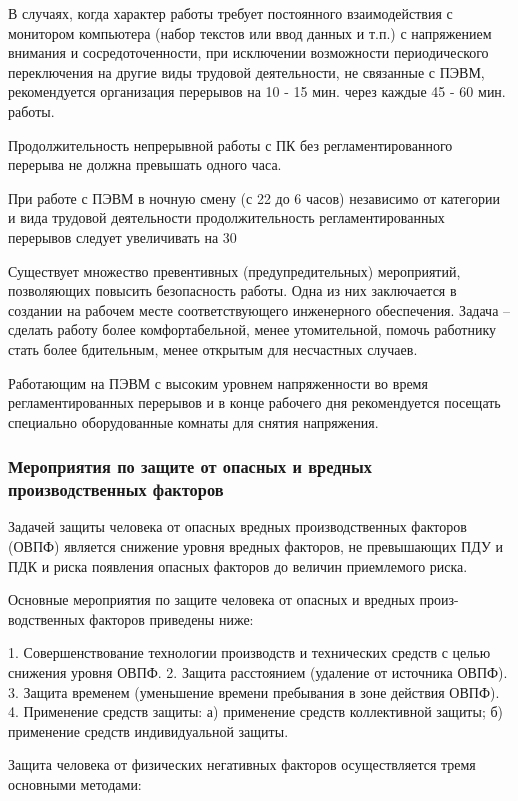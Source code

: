 В случаях, когда характер работы требует постоянного взаимодействия с монитором компьютера (набор текстов или ввод данных и т.п.) с напряжением внимания и сосредоточенности, при исключении возможности периодического переключения на другие виды трудовой деятельности, не связанные с ПЭВМ, рекомендуется организация перерывов на 10 - 15 мин. через каждые 45 - 60 мин. работы.

Продолжительность непрерывной работы с ПК без регламентированного перерыва не должна превышать одного часа.

При работе с ПЭВМ в ночную смену (с 22 до 6 часов) независимо от категории и вида трудовой деятельности продолжительность регламентированных перерывов следует увеличивать на 30%

Существует множество превентивных (предупредительных) мероприятий, позволяющих повысить безопасность работы. Одна из них заключается в создании на рабочем месте соответствующего инженерного обеспечения. Задача – сделать работу более комфортабельной, менее утомительной, помочь работнику стать более бдительным, менее открытым для несчастных случаев.

Работающим на ПЭВМ с высоким уровнем напряженности во время регламентированных перерывов и в конце рабочего дня рекомендуется посещать специально оборудованные комнаты для снятия напряжения.

\subsubsection{Мероприятия по защите от опасных и вредных производственных факторов}

Задачей защиты человека от опасных вредных производственных факторов (ОВПФ) является снижение уровня вредных факторов, не превышающих ПДУ и ПДК и риска появления опасных факторов до величин приемлемого риска.

Основные мероприятия по защите человека от опасных и вредных произ-водственных факторов приведены ниже:

1. Совершенствование технологии производств и технических средств с целью снижения уровня ОВПФ.
2. Защита расстоянием (удаление от источника ОВПФ).
3. Защита временем (уменьшение времени пребывания в зоне действия ОВПФ).
4. Применение средств защиты:
а) применение средств коллективной защиты;
б) применение средств индивидуальной защиты.

Защита человека от физических негативных факторов осуществляется тремя основными методами:

